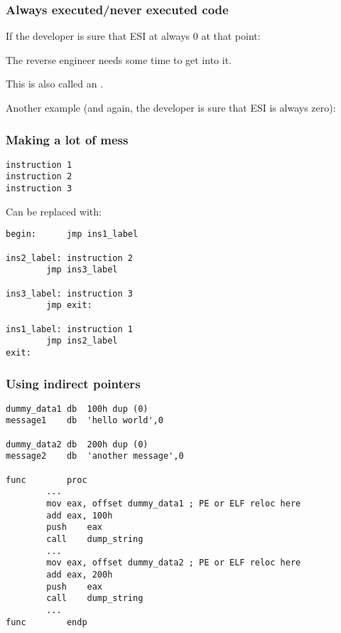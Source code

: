 \subsubsection{Always executed/never executed code}

If the developer is sure that ESI 
at always 0 at that point:



The reverse engineer needs some time to get into it.

This is also called an .

Another example (and again, the developer is sure that ESI is always zero):



\subsubsection{Making a lot of mess}

\begin{lstlisting}
instruction 1
instruction 2
instruction 3
\end{lstlisting}

Can be replaced with:

\begin{lstlisting}[style=customasm]
begin:		jmp	ins1_label

ins2_label:	instruction 2
		jmp	ins3_label

ins3_label:	instruction 3
		jmp	exit:

ins1_label:	instruction 1
		jmp	ins2_label
exit:
\end{lstlisting}

\subsubsection{Using indirect pointers}

\begin{lstlisting}[style=customasm]
dummy_data1	db	100h dup (0)
message1	db	'hello world',0

dummy_data2	db	200h dup (0)
message2	db	'another message',0

func		proc
		...
		mov	eax, offset dummy_data1 ; PE or ELF reloc here
		add	eax, 100h
		push	eax
		call	dump_string
		...
		mov	eax, offset dummy_data2 ; PE or ELF reloc here
		add	eax, 200h
		push	eax
		call	dump_string
		...
func		endp
\end{lstlisting}

